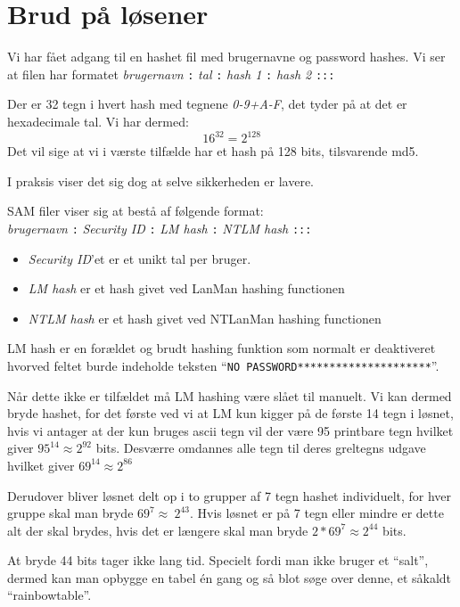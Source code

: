 \documentclass[10pt,a4paper,danish]{article}
\begin{document}
\section{Brud på løsener}

Vi har fået adgang til en hashet fil med brugernavne og password hashes.
Vi ser at filen har formatet \textit{brugernavn} \texttt{:} \textit{tal}
\texttt{:} \textit{hash 1} \texttt{:} \textit{hash 2} \texttt{:::}

Der er 32 tegn i hvert hash med tegnene \textit{0-9+A-F}, det tyder på at det er
hexadecimale tal. Vi har dermed:
\[16^{32} = 2^{128}\]
Det vil sige at vi i værste tilfælde har et hash på 128 bits, tilsvarende md5.

I praksis viser det sig dog at selve sikkerheden er lavere.

SAM filer viser sig at bestå af følgende format\cite{cracking}:\\
\textit{brugernavn} \texttt{:} \textit{Security ID}
\texttt{:} \textit{LM hash} \texttt{:} \textit{NTLM hash} \texttt{:::}
\begin{itemize}
\item \textit{Security ID}'et er et unikt tal per bruger.
\item \textit{LM hash} er et hash givet ved LanMan hashing functionen
\item \textit{NTLM hash} er et hash givet ved NTLanMan hashing functionen
\end{itemize}

LM hash er en forældet og brudt hashing funktion som normalt er deaktiveret
hvorved feltet burde indeholde teksten ``\texttt{NO
  PASSWORD*********************}''.

Når dette ikke er tilfældet må LM hashing være slået til manuelt.
Vi kan dermed bryde hashet, for det første ved vi at LM kun kigger på de første
14 tegn i løsnet, hvis vi antager at der kun bruges ascii tegn vil der være 95
printbare tegn hvilket giver \(95^{14} \approx 2^{92}\) bits.
Desværre omdannes alle tegn til deres greltegns udgave hvilket giver \(69^{14}
\approx 2^{86}\)

Derudover bliver løsnet delt op i to grupper af 7 tegn hashet individuelt,
for hver gruppe skal man bryde \(69^{7} \approx \ 2^{43}\).
Hvis løsnet er på 7 tegn eller mindre er dette alt der skal brydes, hvis det er
længere skal man bryde \(2 * 69^{7} \approx 2^{44}\) bits.

At bryde 44 bits tager ikke lang tid.
Specielt fordi man ikke bruger et ``salt'', dermed kan man opbygge en tabel én
gang og så blot søge over denne, et såkaldt ``rainbowtable''.
\end{document}
